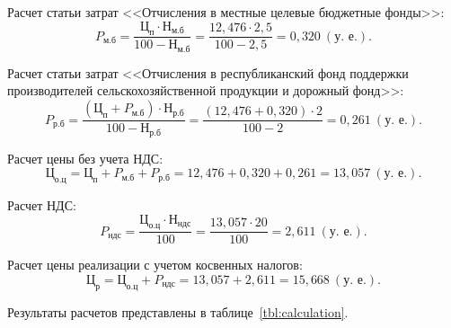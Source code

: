 Расчет статьи затрат 
<<Отчисления в местные целевые бюджетные фонды>>:
\begin{equation*}
P_{\text{м.б}} = 
\dfrac{
  \text{Ц}_{\text{п}} \cdot \text{Н}_{\text{м.б}}
}{
  100 - \text{Н}_{\text{м.б}}
} =
\dfrac{12{,}476 \cdot 2{,}5 }{100 - 2{,}5}  =
0{,}320 \: (\text{у.~е.}).
\end{equation*}

Расчет статьи затрат 
<<Отчисления в республиканский фонд поддержки производителей
сельскохозяйственной продукции и дорожный фонд>>:
\begin{equation*}
P_{\text{р.б}} = 
\dfrac{
  (\text{Ц}_{\text{п}} + P_{\text{м.б}}) \cdot \text{Н}_{\text{р.б}}
}{
  100 - \text{Н}_{\text{р.б}}
} =
\dfrac{(12{,}476 + 0{,}320) \cdot 2 }{100 - 2} =
0{,}261 \: (\text{у.~е.}).
\end{equation*}

Расчет цены без учета НДС:
\begin{equation*}
\text{Ц}_{\text{о.ц}} = 
\text{Ц}_{\text{п}} + P_{\text{м.б}} + P_{\text{р.б}} = 
12{,}476 + 0{,}320 + 0{,}261 =
13{,}057 \: (\text{у.~е.}).
\end{equation*}

Расчет НДС:
\begin{equation*}
P_{\text{ндс}} = 
\dfrac{
  \text{Ц}_{\text{о.ц}} \cdot \text{Н}_{\text{ндс}}
}{
  100
} =
\dfrac{13{,}057 \cdot 20}{100}  =
2{,}611 \: (\text{у.~е.}).
\end{equation*}

Расчет цены реализации с учетом косвенных налогов:
\begin{equation*}
\text{Ц}_{\text{р}} = 
\text{Ц}_{\text{о.ц}} + P_{\text{ндс}} =
13{,}057 + 2{,}611 = 
15{,}668 \: (\text{у.~е.}).
\end{equation*}

Результаты расчетов представлены в таблице~\ref{tbl:calculation}.